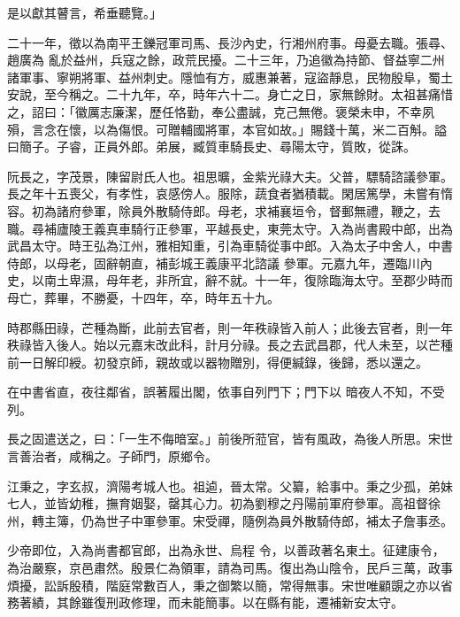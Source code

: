 \begin{pinyinscope}
 是以獻其瞽言，希垂聽覽。」



 二十一年，徵以為南平王鑠冠軍司馬、長沙內史，行湘州府事。母憂去職。張尋、趙廣為
 亂於益州，兵寇之餘，政荒民擾。二十三年，乃追徽為持節、督益寧二州諸軍事、寧朔將軍、益州刺史。隱恤有方，威惠兼著，寇盜靜息，民物殷阜，蜀土安說，至今稱之。二十九年，卒，時年六十二。身亡之日，家無餘財。太祖甚痛惜之，詔曰：「徽厲志廉潔，歷任恪勤，奉公盡誠，克己無倦。褒榮未申，不幸夙殞，言念在懷，以為傷恨。可贈輔國將軍，本官如故。」賜錢十萬，米二百斛。謚曰簡子。子睿，正員外郎。弟展，臧質車騎長史、尋陽太守，質敗，從誅。



 阮長之，字茂景，陳留尉氏人也。祖思曠，金紫光祿大夫。父普，驃騎諮議參軍。長之年十五喪父，有孝性，哀感傍人。服除，蔬食者猶積載。閑居篤學，未嘗有惰容。初為諸府參軍，除員外散騎侍郎。母老，求補襄垣令，督郵無禮，鞭之，去職。尋補廬陵王義真車騎行正參軍，平越長史，東莞太守。入為尚書殿中郎，出為武昌太守。時王弘為江州，雅相知重，引為車騎從事中郎。入為太子中舍人，中書侍郎，以母老，固辭朝直，補彭城王義康平北諮議
 參軍。元嘉九年，遷臨川內史，以南土卑濕，母年老，非所宜，辭不就。十一年，復除臨海太守。至郡少時而母亡，葬畢，不勝憂，十四年，卒，時年五十九。



 時郡縣田祿，芒種為斷，此前去官者，則一年秩祿皆入前人；此後去官者，則一年秩祿皆入後人。始以元嘉末改此科，計月分祿。長之去武昌郡，代人未至，以芒種前一日解印綬。初發京師，親故或以器物贈別，得便緘錄，後歸，悉以還之。



 在中書省直，夜往鄰省，誤著履出閣，依事自列門下；門下以
 暗夜人不知，不受列。



 長之固遣送之，曰：「一生不侮暗室。」前後所蒞官，皆有風政，為後人所思。宋世言善治者，咸稱之。子師門，原鄉令。



 江秉之，字玄叔，濟陽考城人也。祖逌，晉太常。父纂，給事中。秉之少孤，弟妹七人，並皆幼稚，撫育姻娶，罄其心力。初為劉穆之丹陽前軍府參軍。高祖督徐州，轉主簿，仍為世子中軍參軍。宋受禪，隨例為員外散騎侍郎，補太子詹事丞。



 少帝即位，入為尚書都官郎，出為永世、烏程
 令，以善政著名東土。征建康令，為治嚴察，京邑肅然。殷景仁為領軍，請為司馬。復出為山陰令，民戶三萬，政事煩擾，訟訴殷積，階庭常數百人，秉之御繁以簡，常得無事。宋世唯顧覬之亦以省務著績，其餘雖復刑政修理，而未能簡事。以在縣有能，遷補新安太守。




\end{pinyinscope}
